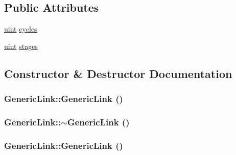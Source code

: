 \subsection*{Public Attributes}
\begin{CompactItemize}
\item 
\hyperlink{outputBuffer_8h_91ad9478d81a7aaf2593e8d9c3d06a14}{uint} \hyperlink{classGenericLink_b4188829f4bf0096117b2d81517f1201}{cycles}
\item 
\hyperlink{outputBuffer_8h_91ad9478d81a7aaf2593e8d9c3d06a14}{uint} \hyperlink{classGenericLink_7c2197f0b770d473c2ee0305967bfad7}{stages}
\end{CompactItemize}


\subsection{Constructor \& Destructor Documentation}
\hypertarget{classGenericLink_228314904a07730170bfe994177f33b4}{
\subsubsection[{GenericLink}]{\setlength{\rightskip}{0pt plus 5cm}GenericLink::GenericLink ()}}
\label{classGenericLink_228314904a07730170bfe994177f33b4}


\hypertarget{classGenericLink_c67cbdcd115d4e41db4c379119bfdcc4}{
\subsubsection[{$\sim$GenericLink}]{\setlength{\rightskip}{0pt plus 5cm}GenericLink::$\sim$GenericLink ()}}
\label{classGenericLink_c67cbdcd115d4e41db4c379119bfdcc4}


\hypertarget{classGenericLink_228314904a07730170bfe994177f33b4}{
\subsubsection[{GenericLink}]{\setlength{\rightskip}{0pt plus 5cm}GenericLink::GenericLink ()}}
\label{classGenericLink_228314904a07730170bfe994177f33b4}


